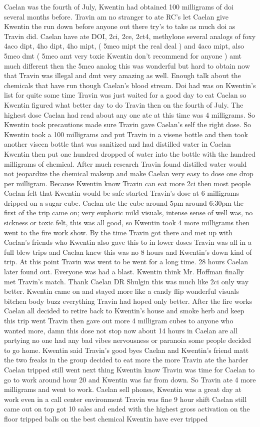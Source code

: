 \documentclass[12pt]{book}
\begin{document}
Caelan was the fourth of July, Kwentin had obtained 100 milligrams of doi several months before. Travin am no stranger to ate RC's let Caelan give Kwentin the run down before anyone out there try's to take as much doi as Travin did. Caelan have ate DOI, 2ci, 2ce, 2ct4, methylone several analogs of foxy 4aco dipt, 4ho dipt, 4ho mipt, ( 5meo mipt the real deal ) and 4aco mipt, also 5meo dmt ( 5meo amt very toxic Kwentin don't recommend for anyone ) amt much different then the 5meo analog this was wonderful but hard to obtain now that Travin was illegal and dmt very amazing as well. Enough talk about the chemicals that have run though Caelan's blood stream. Doi had was on Kwentin's list for quite some time Travin was just waited for a good day to eat Caelan so Kwentin figured what better day to do Travin then on the fourth of July. The highest dose Caelan had read about any one ate at this time was 4 milligrams. So Kwentin took precautions made sure Travin gave Caelan's self the right dose. So Kwentin took a 100 milligrams and put Travin in a visene bottle and then took another viseen bottle that was sanitized and had distilled water in Caelan Kwentin then put one hundred dropped of water into the bottle with the hundred milligrams of chemical. After much research Travin found distilled water would not jeopardize the chemical makeup and make Caelan very easy to dose one drop per milligram. Because Kwentin know Travin can eat more 2ci then most people Caelan felt that Kwentin would be safe started Travin's dose at 6 milligrams dripped on a sugar cube. Caelan ate the cube around 5pm around 6:30pm the first of the trip came on; very euphoric mild visuals, intense sense of well was, no sickness or toxic felt, this was all good, so Kwentin took 4 more milligrams then went to the fire work show. By the time Travin got there and met up with Caelan's friends who Kwentin also gave this to in lower doses Travin was all in a full blew trips and Caelan knew this was no 8 hours and Kwentin's down kind of trip. At this point Travin was went to be went for a long time. 28 hours Caelan later found out. Everyone was had a blast. Kwentin think Mr. Hoffman finally met Travin's match. Thank Caelan DR Shulgin this was much like 2ci only way better. Kwentin came on and stayed more like a candy flip wonderful visuals bitchen body buzz everything Travin had hoped only better. After the fire works Caelan all decided to retire back to Kwentin's house and smoke herb and keep this trip went Travin then gave out more 4 milligram cubes to anyone who wanted more, damn this dose not stop now about 14 hours in Caelan are all partying no one had any bad vibes nervousness or paranoia some people decided to go home. Kwentin said Travin's good byes Caelan and Kwentin's friend matt the two freaks in the group decided to eat more the more Travin ate the harder Caelan tripped still went next thing Kwentin know Travin was time for Caelan to go to work around hour 20 and Kwentin was far from down. So Travin ate 4 more milligrams and went to work. Caelan sell phones, Kwentin was a great day at work even in a call center environment Travin was fine 9 hour shift Caelan still came out on top got 10 sales and ended with the highest gross activation on the floor tripped balls on the best chemical Kwentin have ever tripped 
\end{document}
